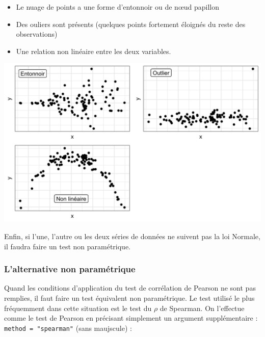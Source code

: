\documentclass[a4paperpaper,]{article}
\newenvironment{Shaded}{\begin{snugshade}}{\end{snugshade}}
\newcommand{\DataTypeTok}[1]{\textcolor[rgb]{0.00,0.34,0.68}{#1}}
\newcommand{\KeywordTok}[1]{\textcolor[rgb]{0.12,0.11,0.11}{\textbf{#1}}}
\newcommand{\NormalTok}[1]{\textcolor[rgb]{0.12,0.11,0.11}{#1}}
\newcommand{\OperatorTok}[1]{\textcolor[rgb]{0.12,0.11,0.11}{#1}}
\newcommand{\StringTok}[1]{\textcolor[rgb]{0.75,0.01,0.01}{#1}}
\providecommand{\tightlist}{%
  \setlength{\itemsep}{0pt}\setlength{\parskip}{0pt}}
\begin{document}
\begin{itemize}
\tightlist
\item
  Le nuage de points a une forme d'entonnoir ou de nœud papillon
\item
  Des ouliers sont présents (quelques points fortement éloignés du reste des observations)
\item
  Une relation non linéaire entre les deux variables.
\end{itemize}

\begin{center}\includegraphics[width=0.9\linewidth]{figure/unnamed-chunk-106-1} \end{center}

Enfin, si l'une, l'autre ou les deux séries de données ne suivent pas la loi Normale, il faudra faire un test non paramétrique.

\hypertarget{lalternative-non-parametrique-4}{%
\subsubsection{L'alternative non paramétrique}\label{lalternative-non-parametrique-4}}

Quand les conditions d'application du test de corrélation de Pearson ne sont pas remplies, il faut faire un test équivalent non paramétrique. Le test utilisé le plus fréquemment dans cette situation est le test du \(\rho\) de Spearman. On l'effectue comme le test de Pearson en précisant simplement un argument supplémentaire : \texttt{method\ =\ "spearman"} (sans maujscule) :

\begin{Shaded}
\end{Shaded}
\end{document}
